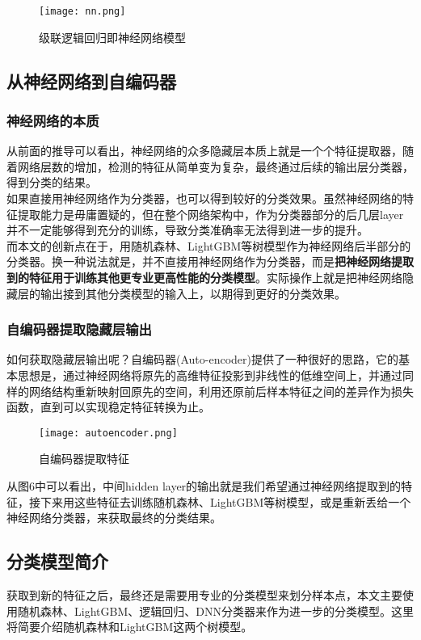 \begin{figure}[H]
    \centering
    \texttt{[image: nn.png]}
    \caption{级联逻辑回归即神经网络模型}
    \label{fig:nn}
\end{figure}

\subsection{从神经网络到自编码器}
\subsubsection{神经网络的本质}
从前面的推导可以看出，神经网络\cite{nn}的众多隐藏层本质上就是一个个特征提取器，随着网络层数的增加，检测的特征从简单变为复杂，最终通过后续的输出层分类器，得到分类的结果。\\

如果直接用神经网络作为分类器，也可以得到较好的分类效果。虽然神经网络的特征提取能力是毋庸置疑的，但在整个网络架构中，作为分类器部分的后几层layer并不一定能够得到充分的训练，导致分类准确率无法得到进一步的提升。\\

而本文的创新点在于，用随机森林、LightGBM等树模型作为神经网络后半部分的分类器。换一种说法就是，并不直接用神经网络作为分类器，而是\textbf{把神经网络提取到的特征用于训练其他更专业更高性能的分类模型}。实际操作上就是把神经网络隐藏层的输出接到其他分类模型的输入上，以期得到更好的分类效果。

\subsubsection{自编码器提取隐藏层输出}
如何获取隐藏层输出呢？自编码器(Auto-encoder)\cite{ae}提供了一种很好的思路，它的基本思想是，通过神经网络将原先的高维特征投影到非线性的低维空间上，并通过同样的网络结构重新映射回原先的空间，利用还原前后样本特征之间的差异作为损失函数，直到可以实现稳定特征转换为止。

\begin{figure}[H]
    \centering
    \texttt{[image: autoencoder.png]}
    \caption{自编码器提取特征}
    \label{fig:autoencoder}
\end{figure}

从图6中可以看出，中间hidden layer的输出就是我们希望通过神经网络提取到的特征，接下来用这些特征去训练随机森林、LightGBM等树模型，或是重新丢给一个神经网络分类器，来获取最终的分类结果。

\subsection{分类模型简介}
获取到新的特征之后，最终还是需要用专业的分类模型来划分样本点，本文主要使用随机森林、LightGBM、逻辑回归、DNN分类器来作为进一步的分类模型。这里将简要介绍随机森林和LightGBM这两个树模型。


